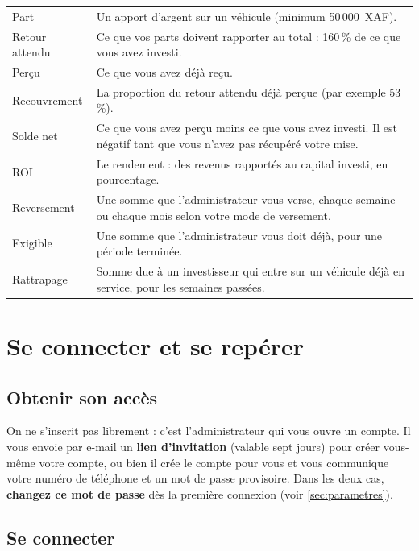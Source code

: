 \documentclass[11pt,a4paper]{article}
\newcommand{\Needspace}[1]{\par\ifdim\pagegoal<\maxdimen\ifdim\dimexpr\pagegoal-\pagetotal\relax<#1\relax\newpage\fi\fi}
\let\oldsubsection\subsection
\renewcommand{\subsection}{\Needspace{5.5cm}\oldsubsection}
\let\oldsection\section
\renewcommand{\section}{\clearpage\oldsection}
\begin{document}
\begin{center}
\begin{tabularx}{\linewidth}{@{}L{3.6cm}X@{}}
\toprule
Part & Un apport d'argent sur un véhicule (minimum 50\,000~XAF).\\
Retour attendu & Ce que vos parts doivent rapporter au total : 160\,\% de ce que vous avez investi.\\
Perçu & Ce que vous avez déjà reçu.\\
Recouvrement & La proportion du retour attendu déjà perçue (par exemple 53\,\%).\\
Solde net & Ce que vous avez perçu moins ce que vous avez investi. Il est négatif tant que vous n'avez pas récupéré votre mise.\\
ROI & Le rendement : des revenus rapportés au capital investi, en pourcentage.\\
Reversement & Une somme que l'administrateur vous verse, chaque semaine ou chaque mois selon votre mode de versement.\\
Exigible & Une somme que l'administrateur vous doit déjà, pour une période terminée.\\
Rattrapage & Somme due à un investisseur qui entre sur un véhicule déjà en service, pour les semaines passées.\\
\bottomrule
\end{tabularx}
\end{center}

\section{Se connecter et se repérer}

\subsection{Obtenir son accès}

On ne s'inscrit pas librement : c'est l'administrateur qui vous ouvre un compte. Il vous envoie par e-mail un \textbf{lien d'invitation} (valable sept jours) pour créer vous-même votre compte, ou bien il crée le compte pour vous et vous communique votre numéro de téléphone et un mot de passe provisoire. Dans les deux cas, \textbf{changez ce mot de passe} dès la première connexion (voir \autoref{sec:parametres}).

\subsection{Se connecter}
\end{document}
